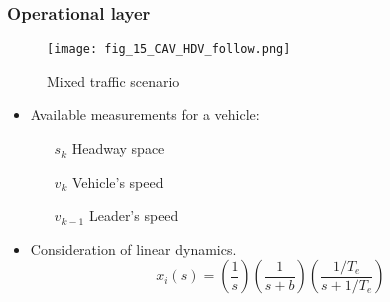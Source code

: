 
\begin{frame}
    \frametitle{Operational layer}
    \begin{figure}
      \centering
      \texttt{[image: fig\_15\_CAV\_HDV\_follow.png]}
      \caption{Mixed traffic scenario}
    \end{figure}
    \begin{itemize}[<+->]
      \item Available measurements for a vehicle: 
      \begin{itemize}
       \item[\(s_k\)] Headway space 
       \item[\(v_k\)] Vehicle's speed
       \item[\(v_{k-1}\)] Leader's speed
      \end{itemize}
      \item Consideration of  linear dynamics. 
        \begin{equation*}
          x_i(s) = \left(\frac{1}{s}\right)\left(\frac{1}{s+b}\right)\left(\frac{1/T_e}{s+1/T_e}\right)
        \end{equation*}
    \end{itemize}
\end{frame}